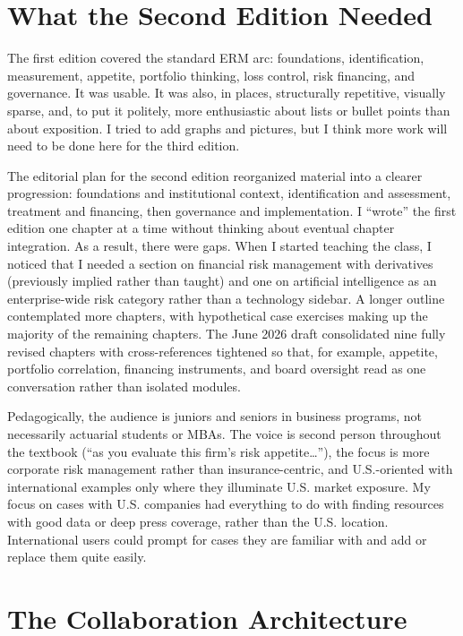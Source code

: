 \documentclass[11pt,letterpaper]{article}
\begin{document}
\section{What the Second Edition Needed}

The first edition covered the standard ERM arc: foundations, identification, measurement, appetite, portfolio thinking, loss control, risk financing, and governance. It was usable. It was also, in places, structurally repetitive, visually sparse, and, to put it politely, more enthusiastic about lists or bullet points than about exposition. I tried to add graphs and pictures, but I think more work will need to be done here for the third edition.

The editorial plan for the second edition reorganized material into a clearer progression: foundations and institutional context, identification and assessment, treatment and financing, then governance and implementation. I ``wrote'' the first edition one chapter at a time without thinking about eventual chapter integration. As a result, there were gaps.  When I started teaching the class, I noticed that I needed a section on financial risk management with derivatives (previously implied rather than taught) and one on artificial intelligence as an enterprise-wide risk category rather than a technology sidebar. A longer outline contemplated more chapters, with hypothetical case exercises making up the majority of the remaining chapters. The June 2026 draft consolidated nine fully revised chapters with cross-references tightened so that, for example, appetite, portfolio correlation, financing instruments, and board oversight read as one conversation rather than isolated modules.

Pedagogically, the audience is juniors and seniors in business programs, not necessarily actuarial students or MBAs. The voice is second person throughout the textbook (``as you evaluate this firm's risk appetite\ldots''), the focus is more corporate risk management rather than insurance-centric, and U.S.-oriented with international examples only where they illuminate U.S. market exposure. My focus on cases with U.S. companies had everything to do with finding resources with good data or deep press coverage, rather than the U.S. location. International users could prompt for cases they are familiar with and add or replace them quite easily. 

\section{The Collaboration Architecture}
\end{document}
